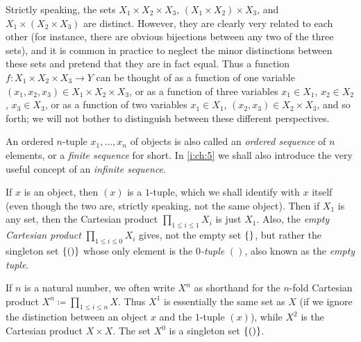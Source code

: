 \begin{note}
  Strictly speaking, the sets \(X_1 \times X_2 \times X_3\), \((X_1 \times X_2) \times X_3\), and \(X_1 \times (X_2 \times X_3)\) are distinct.
  However, they are clearly very related to each other (for instance, there are obvious bijections between any two of the three sets), and it is common in practice to neglect the minor distinctions between these sets and pretend that they are in fact equal.
  Thus a function \(f : X_1 \times X_2 \times X_3 \to Y\) can be thought of as a function of one variable \((x_1, x_2, x_3) \in X_1 \times X_2 \times X_3\), or as a function of three variables \(x_1 \in X_1\), \(x_2 \in X_2\), \(x_3 \in X_3\), or as a function of two variables \(x_1 \in X_1\), \((x_2, x_3) \in X_2 \times X_3\), and so forth;
  we will not bother to distinguish between these different perspectives.
\end{note}

\setcounter{thm}{9}
\begin{rmk}\label{i:3.5.10}
  An ordered \(n\)-tuple \(x_1, \dots, x_n\) of objects is also called an \emph{ordered sequence} of \(n\) elements, or a \emph{finite sequence} for short.
  In \cref{i:ch:5} we shall also introduce the very useful concept of an \emph{infinite sequence}.
\end{rmk}

\begin{eg}\label{i:3.5.11}
  If \(x\) is an object, then \((x)\) is a \(1\)-tuple, which we shall identify with \(x\) itself (even though the two are, strictly speaking, not the same object).
  Then if \(X_1\) is any set, then the Cartesian product \(\prod_{1 \leq i \leq 1} X_i\) is just \(X_1\).
  Also, the \emph{empty Cartesian product} \(\prod_{1 \leq i \leq 0} X_i\) gives, not the empty set \(\left\lbrace\right\rbrace\), but rather the singleton set \(\left\lbrace()\right\rbrace\) whose only element is the \emph{\(0\)-tuple} \(()\), also known as the \emph{empty tuple}.

  If \(n\) is a natural number, we often write \(X^n\) as shorthand for the \(n\)-fold Cartesian product \(X^n \coloneqq \prod_{1 \leq i \leq n} X\).
  Thus \(X^1\) is essentially the same set as \(X\) (if we ignore the distinction between an object \(x\) and the \(1\)-tuple \((x)\)), while \(X^2\) is the Cartesian product \(X \times X\).
  The set \(X^0\) is a singleton set \(\left\lbrace()\right\rbrace\).
\end{eg}

